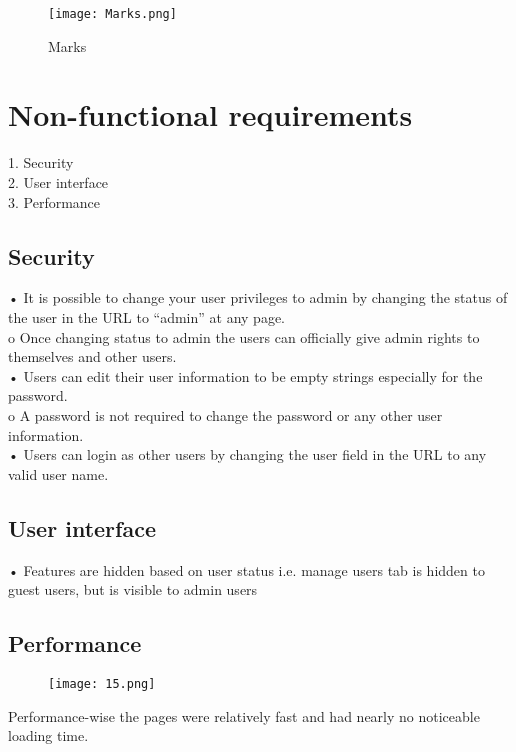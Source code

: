 \documentclass[english]{article}
\begin{document}
\clearpage

\begin{figure}[ht!]
\center
\texttt{[image: Marks.png]}
\caption{Marks}
\end{figure}

\section{Non-functional requirements}
1.	Security\\
2.	User interface\\
3.	Performance\\

\subsection{Security}
•	It is possible to change your user privileges to admin by changing the status of the user in the URL to “admin” at any page.\\
o	Once changing status to admin the users can officially give admin rights to themselves and other users.\\
•	Users can edit their user information to be empty strings especially for the password.\\
o	A password is not required to change the password or any other user information.\\
•	Users can login as other users by changing the user field in the URL to any valid user name.\\


\subsection{User interface}
•	Features are hidden based on user status i.e. manage users tab is hidden to guest users, but is visible to admin users\\

\subsection{Performance}
\begin{figure}[ht!]
\texttt{[image: 15.png]}
\end{figure}
Performance-wise the pages were relatively fast and had nearly no noticeable loading time.
\end{document}
